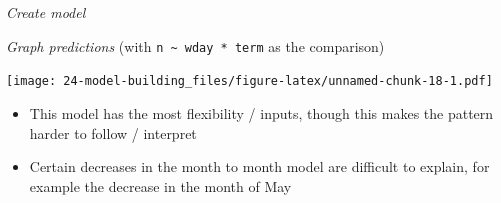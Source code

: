 \documentclass[]{book}
\newenvironment{Shaded}{\begin{snugshade}}{\end{snugshade}}
\newcommand{\DataTypeTok}[1]{\textcolor[rgb]{0.13,0.29,0.53}{#1}}
\newcommand{\DecValTok}[1]{\textcolor[rgb]{0.00,0.00,0.81}{#1}}
\newcommand{\KeywordTok}[1]{\textcolor[rgb]{0.13,0.29,0.53}{\textbf{#1}}}
\newcommand{\NormalTok}[1]{#1}
\newcommand{\OperatorTok}[1]{\textcolor[rgb]{0.81,0.36,0.00}{\textbf{#1}}}
\newcommand{\StringTok}[1]{\textcolor[rgb]{0.31,0.60,0.02}{#1}}
\providecommand{\tightlist}{%
  \setlength{\itemsep}{0pt}\setlength{\parskip}{0pt}}
\theoremstyle{definition}
\theoremstyle{definition}
\theoremstyle{definition}
\theoremstyle{remark}
\begin{document}
\begin{enumerate}
  \emph{Create model}

\begin{Shaded}
\end{Shaded}

  \emph{Graph predictions} (with
  \texttt{n\ \textasciitilde{}\ wday\ *\ term} as the comparison)

\begin{Shaded}
\end{Shaded}

  \texttt{[image: 24-model-building\_files/figure-latex/unnamed-chunk-18-1.pdf]}

  \begin{itemize}
  \tightlist
  \item
    This model has the most flexibility / inputs, though this makes the
    pattern harder to follow / interpret
  \item
    Certain decreases in the month to month model are difficult to
    explain, for example the decrease in the month of May
  \end{itemize}


\end{enumerate}
\end{document}

